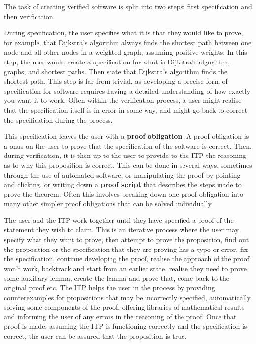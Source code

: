\documentclass[
]{article}
\begin{document}
The task of creating verified software is split into two steps: first
specification and then verification.

During specification, the user specifies what it is that they would like
to prove, for example, that Dijkstra's algorithm always finds the
shortest path between one node and all other nodes in a weighted graph,
assuming positive weights. In this step, the user would create a
specification for what is Dijkstra's algorithm, graphs, and shortest
paths. Then state that Dijkstra's algorithm finds the shortest path.
This step is far from trivial, as developing a precise form of
specification for software requires having a detailed understanding of
how exactly you want it to work. Often within the verification process,
a user might realise that the specification itself is in error in some
way, and might go back to correct the specification during the process.

This specification leaves the user with a \textbf{proof obligation}. A
proof obligation is a onus on the user to prove that the specification
of the software is correct. Then, during verification, it is then up to
the user to provide to the ITP the reasoning as to why this proposition
is correct. This can be done in several ways, sometimes through the use
of automated software, or manipulating the proof by pointing and
clicking, or writing down a \textbf{proof script} that describes the
steps made to prove the theorem. Often this involves breaking down one
proof obligation into many other simpler proof obligations that can be
solved individually.

The user and the ITP work together until they have specified a proof of
the statement they wish to claim. This is an iterative process where the
user may specify what they want to prove, then attempt to prove the
proposition, find out the proposition or the specification that they are
proving has a typo or error, fix the specification, continue developing
the proof, realise the approach of the proof won't work, backtrack and
start from an earlier state, realise they need to prove some auxiliary
lemma, create the lemma and prove that, come back to the original proof
etc. The ITP helps the user in the process by providing counterexamples
for propositions that may be incorrectly specified, automatically
solving some components of the proof, offering libraries of mathematical
results and informing the user of any errors in the reasoning of the
proof. Once that proof is made, assuming the ITP is functioning
correctly and the specification is correct, the user can be assured that
the proposition is true.
\end{document}
